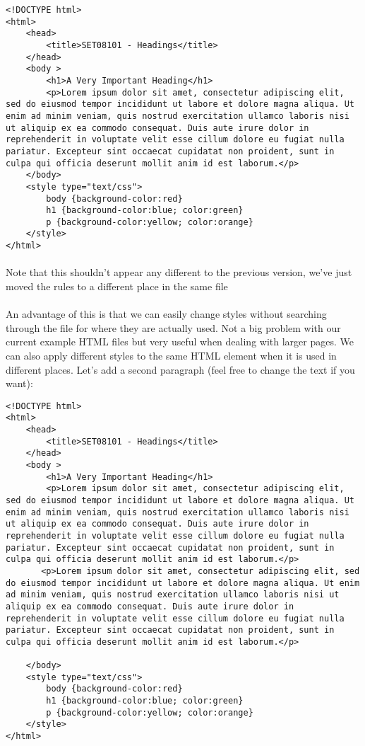 \documentclass[10pt, a4paper, twosize]{article}
\begin{document}
\begin{lstlisting}
<!DOCTYPE html>
<html>
    <head>
        <title>SET08101 - Headings</title>
    </head>
    <body >
        <h1>A Very Important Heading</h1>
        <p>Lorem ipsum dolor sit amet, consectetur adipiscing elit, sed do eiusmod tempor incididunt ut labore et dolore magna aliqua. Ut enim ad minim veniam, quis nostrud exercitation ullamco laboris nisi ut aliquip ex ea commodo consequat. Duis aute irure dolor in reprehenderit in voluptate velit esse cillum dolore eu fugiat nulla pariatur. Excepteur sint occaecat cupidatat non proident, sunt in culpa qui officia deserunt mollit anim id est laborum.</p>
    </body>
    <style type="text/css">
        body {background-color:red}
        h1 {background-color:blue; color:green}
        p {background-color:yellow; color:orange}
    </style>
</html>
\end{lstlisting}

\paragraph{} Note that this shouldn't appear any different to the previous version, we've just moved the rules to a different place in the same file

\paragraph{} An advantage of this is that we can easily change styles without searching through the file for where they are actually used. Not a big problem with our current example HTML files but very useful when dealing with larger pages. We can also apply different styles to the same HTML element when it is used in different places. Let's add a second paragraph (feel free to change the text if you want):

\begin{lstlisting}
<!DOCTYPE html>
<html>
    <head>
        <title>SET08101 - Headings</title>
    </head>
    <body >
        <h1>A Very Important Heading</h1>
        <p>Lorem ipsum dolor sit amet, consectetur adipiscing elit, sed do eiusmod tempor incididunt ut labore et dolore magna aliqua. Ut enim ad minim veniam, quis nostrud exercitation ullamco laboris nisi ut aliquip ex ea commodo consequat. Duis aute irure dolor in reprehenderit in voluptate velit esse cillum dolore eu fugiat nulla pariatur. Excepteur sint occaecat cupidatat non proident, sunt in culpa qui officia deserunt mollit anim id est laborum.</p>
       <p>Lorem ipsum dolor sit amet, consectetur adipiscing elit, sed do eiusmod tempor incididunt ut labore et dolore magna aliqua. Ut enim ad minim veniam, quis nostrud exercitation ullamco laboris nisi ut aliquip ex ea commodo consequat. Duis aute irure dolor in reprehenderit in voluptate velit esse cillum dolore eu fugiat nulla pariatur. Excepteur sint occaecat cupidatat non proident, sunt in culpa qui officia deserunt mollit anim id est laborum.</p>

    </body>
    <style type="text/css">
        body {background-color:red}
        h1 {background-color:blue; color:green}
        p {background-color:yellow; color:orange}
    </style>
</html>
\end{lstlisting}
\end{document}
